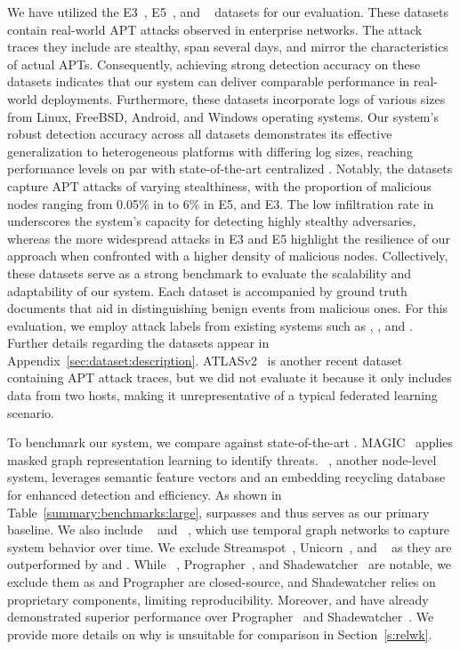  We have utilized the \darpa E3~\cite{error3}, E5~\cite{bug5}, and \optc~\cite{darpaoptc} datasets for our evaluation. These datasets contain real-world APT attacks observed in enterprise networks. The attack traces they include are stealthy, span several days, and mirror the characteristics of actual APTs. Consequently, achieving strong detection accuracy on these datasets indicates that our system can deliver comparable performance in real-world deployments. Furthermore, these datasets incorporate logs of various sizes from Linux, FreeBSD, Android, and Windows operating systems. Our system’s robust detection accuracy across all datasets demonstrates its effective generalization to heterogeneous platforms with differing log sizes, reaching performance levels on par with state-of-the-art centralized \pids. Notably, the datasets capture APT attacks of varying stealthiness, with the proportion of malicious nodes ranging from 0.05\% in \optc to 6\% in E5, and E3. The low infiltration rate in \optc underscores the system’s capacity for detecting highly stealthy adversaries, whereas the more widespread attacks in E3 and E5 highlight the resilience of our approach when confronted with a higher density of malicious nodes. Collectively, these datasets serve as a strong benchmark to evaluate the scalability and adaptability of our system. Each \darpa dataset is accompanied by ground truth documents that aid in distinguishing benign events from malicious ones. For this evaluation, we employ attack labels from existing systems such as \threatrace, \kairos, and \flash. Further details regarding the datasets appear in Appendix~\ref{sec:dataset:description}. ATLASv2~\cite{riddle2023atlasv2} is another recent dataset containing APT attack traces, but we did not evaluate it because it only includes data from two hosts, making it unrepresentative of a typical federated learning scenario.

 To benchmark our system, we compare against state-of-the-art \pids. MAGIC~\cite{jia2023magic} applies masked graph representation learning to identify threats. \flash~\cite{flash2024}, another node-level system, leverages semantic feature vectors and an embedding recycling database for enhanced detection and efficiency. As shown in Table~\ref{summary:benchmarks:large}, \flash surpasses  and thus serves as our primary baseline. We also include \orthrus~\cite{jiang2025orthrus} and \kairos~\cite{cheng2023kairos}, which use temporal graph networks to capture system behavior over time. We exclude Streamspot~\cite{streamspot}, Unicorn~\cite{han2020unicorn}, and \threatrace~\cite{wang2022threatrace} as they are outperformed by \flash and \kairos. While \disdet~\cite{dong2023distdet}, Prographer~\cite{yangprographer}, and Shadewatcher~\cite{shadewatcher} are notable, we exclude them as \disdet and Prographer are closed-source, and Shadewatcher relies on proprietary components, limiting reproducibility. Moreover, \flash and \orthrus have already demonstrated superior performance over Prographer~\cite{yangprographer} and Shadewatcher~\cite{shadewatcher}. We provide more details on why \disdet is unsuitable for comparison in Section~\ref{s:relwk}.


